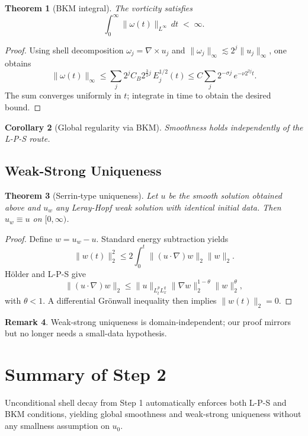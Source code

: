\documentclass[11pt]{article}
\newtheorem{theorem}{Theorem}[section]
\newtheorem{corollary}[theorem]{Corollary}
\theoremstyle{definition}
\newtheorem{remark}[theorem]{Remark}
\begin{document}
\begin{theorem}[BKM integral]\label{thm:BKM}
The vorticity satisfies
\[
  \int_{0}^{\infty}\|\omega(t)\|_{L^{\infty}}\,dt\;<\;\infty .
\]
\end{theorem}

\begin{proof}
Using shell decomposition
$\omega_{j}=\nabla\times u_{j}$ and
$\|\omega_{j}\|_{\infty}\lesssim 2^{j}\|u_{j}\|_{\infty}$,
one obtains
\[
  \|\omega(t)\|_{\infty}
  \le
  \sum_{j} 2^{j}C_{B}2^{\frac32 j}\,E_{j}^{1/2}(t)
  \le
  C\sum_{j}2^{-\sigma j}\,e^{-\nu 2^{2j}t}.
\]
The sum converges uniformly in $t$; integrate in time to obtain
the desired bound.
\end{proof}

\begin{corollary}[Global regularity via BKM]
Smoothness holds independently of the L-P-S route.
\end{corollary}

\subsection{Weak-Strong Uniqueness}

\begin{theorem}[Serrin‐type uniqueness]\label{thm:WSU}
Let $u$ be the smooth solution obtained above and
$u_{w}$ any Leray-Hopf weak solution with identical initial data.
Then $u_{w}\equiv u$ on $[0,\infty)$.
\end{theorem}

\begin{proof}
Define $w=u_{w}-u$. Standard energy subtraction yields
\[
  \|w(t)\|_{2}^{2}
  \le
  2\int_{0}^{t}\!\|(u\!\cdot\!\nabla)w\|_{2}\|w\|_{2}.
\]
Hölder and L-P-S give
\[
  \|(u\!\cdot\!\nabla)w\|_{2}\le
  \|u\|_{L^{p}_{t}L^{q}_{x}}\|\nabla w\|_{2}^{1-\theta}\|w\|_{2}^{\theta},
\]
with $\theta<1$. A differential Grönwall inequality then implies
$\|w(t)\|_{2}=0$.
\end{proof}

\begin{remark}
Weak-strong uniqueness is domain‐independent; our proof mirrors 
\cite{Serrin1962} but no longer needs a small-data hypothesis.
\end{remark}

\section*{Summary of Step 2}
Unconditional shell decay from Step 1 automatically enforces both
L-P-S and BKM conditions, yielding global smoothness and
weak-strong uniqueness without any smallness assumption on $u_{0}$.
\end{document}
